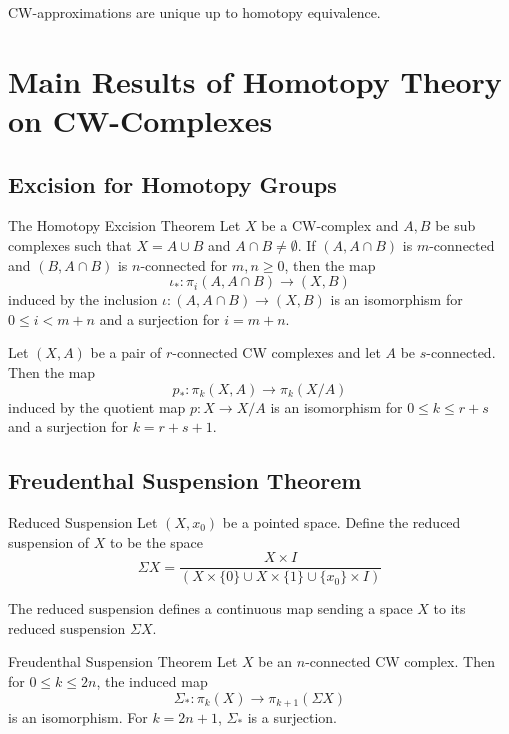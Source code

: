 \documentclass[a4paper]{article}
\begin{document}
\begin{crl}{}{} CW-approximations are unique up to homotopy equivalence. 
\end{crl}

\pagebreak

\section{Main Results of Homotopy Theory on CW-Complexes}
\subsection{Excision for Homotopy Groups}
\begin{thm}{The Homotopy Excision Theorem}{} Let $X$ be a CW-complex and $A,B$ be sub complexes such that $X=A\cup B$ and $A\cap B\neq\emptyset$. If $(A,A\cap B)$ is $m$-connected and $(B,A\cap B)$ is $n$-connected for $m,n\geq 0$, then the map $$\iota_\ast:\pi_i(A,A\cap B)\to(X,B)$$ induced by the inclusion $\iota:(A,A\cap B)\to(X,B)$ is an isomorphism for $0\leq i<m+n$ and a surjection for $i=m+n$. 
\end{thm}

\begin{prp}{}{} Let $(X,A)$ be a pair of $r$-connected CW complexes and let $A$ be $s$-connected. Then the map $$p_\ast:\pi_k(X,A)\to\pi_k(X/A)$$ induced by the quotient map $p:X\to X/A$ is an isomorphism for $0\leq k\leq r+s$ and a surjection for $k=r+s+1$. 
\end{prp}

\subsection{Freudenthal Suspension Theorem}
\begin{defn}{Reduced Suspension}{} Let $(X,x_0)$ be a pointed space. Define the reduced suspension of $X$ to be the space $$\Sigma X=\frac{X\times I}{(X\times\{0\}\cup X\times\{1\}\cup\{x_0\}\times I)}$$
\end{defn}

The reduced suspension defines a continuous map sending a space $X$ to its reduced suspension $\Sigma X$. 

\begin{thm}{Freudenthal Suspension Theorem}{} Let $X$ be an $n$-connected CW complex. Then for $0\leq k\leq 2n$, the induced map $$\Sigma_\ast:\pi_k(X)\to\pi_{k+1}(\Sigma X)$$ is an isomorphism. For $k=2n+1$, $\Sigma_\ast$ is a surjection. 
\end{thm}
\end{document}
